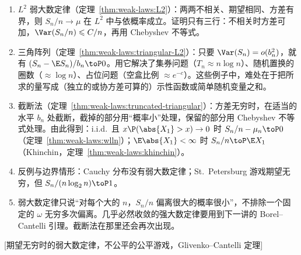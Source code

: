 
\begin{enumerate}
\item $L^2$ 弱大数定律（定理~\ref{thm:weak-laws:L2}）：两两不相关、期望相同、方差有界，则 $S_n/n\to\mu$ 在 $L^2$ 中与依概率成立。证明只有三行：不相关时方差可加，$\Var(S_n/n)\leqslant C/n$，再用 Chebyshev 不等式。
\item 三角阵列（定理~\ref{thm:weak-laws:triangular-L2}）：只要 $\Var(S_n)=o(b_n^2)$，就有 $(S_n-\E S_n)/b_n\toP0$。用它解决了集券问题（$T_n\approx n\log n$）、随机置换的圈数（$\approx\log n$）、占位问题（空盒比例 $\approx e^{-c}$）。这些例子中，难处在于把所求的量写成（独立的或协方差可算的）示性函数或简单随机变量之和。
\item 截断法（定理~\ref{thm:weak-laws:truncated-triangular}）：方差无穷时，在适当的水平 $b_n$ 处截断，截掉的部分用“概率小”处理，保留的部分用 Chebyshev 不等式处理。由此得到：i.i.d.\ 且 $x\P(\abs{X_1}>x)\to0$ 时 $S_n/n-\mu_n\toP0$（定理~\ref{thm:weak-laws:wlln}）；$\E\abs{X_1}<\infty$ 时 $S_n/n\toP \E X_1$（Khinchin，定理~\ref{thm:weak-laws:khinchin}）。
\item 反例与边界情形：Cauchy 分布没有弱大数定律；St.\ Petersburg 游戏期望无穷，但 $S_n/(n\log_2n)\toP1$。
\item 弱大数定律只说“对每个大的 $n$，$S_n/n$ 偏离很大的概率很小”，不排除一个固定的 $\omega$ 无穷多次偏离。几乎必然收敛的强大数定律要用到下一讲的 Borel--Cantelli 引理。截断法在那里还会再次出现。
\end{enumerate}

[期望无穷时的弱大数定律，不公平的公平游戏，Glivenko–Cantelli 定理]
\label{hw:weak-laws}


